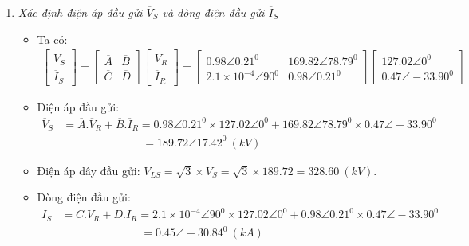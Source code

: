 \documentclass[12pt,a4paper]{article}
\newcommand{\unitp}[1]{~\left({#1}\right)}
\begin{document}
\begin{enumerate}[ \it a. ]
		\item \emph{Xác định điện áp đầu gửi $\overline{V}_S$ và dòng điện đầu gửi $\overline{I}_S$}
			\begin{itemize}
				\item Ta có:
					\begin{align*}
						\left[{\begin{array}{c}
							\overline{V}_S\\
							\overline{I}_S
						\end{array}}\right]
						=
						\left[{\begin{array}{cc}
							\overline{A} & \overline{B}\\
							\overline{C} & \overline{D}
						\end{array}}\right]
						\left[{\begin{array}{c}
							\overline{V}_R\\
							\overline{I}_R
						\end{array}}\right]
						=
						\left[{\begin{array}{cc}
							0.98 \angle 0.21^0 & 169.82 \angle 78.79^0\\
							2.1 \times 10^{-4} \angle 90^0 & 0.98 \angle 0.21^0
						\end{array}}\right]
						\left[{\begin{array}{c}
							127.02 \angle 0^0\\
							0.47 \angle -33.90^0
						\end{array}}\right]
					\end{align*}

				\item Điện áp đầu gửi:
					\begin{align*}
						\overline{V}_S & = \overline{A}. \overline{V}_R + \overline{B}.\overline{I}_R = 0.98 \angle 0.21^0 \times 127.02 \angle 0^0+ 169.82 \angle 78.79^0 \times 0.47 \angle -33.90^0\\
						& \hspace{3cm} = 189.72 \angle 17.42^0 \unitp{kV}
					\end{align*}

				\item Điện áp dây đầu gửi: $V_{LS} = \sqrt{3} \times V_S = \sqrt{3} \times 189.72 = 328.60 \unitp{kV}$.

				\item Dòng điện đầu gửi:
					\begin{align*}
						\overline{I}_S & = \overline{C}. \overline{V}_R + \overline{D}.\overline{I}_R = 2.1 \times 10^{-4} \angle 90^0 \times 127.02 \angle 0^0 + 0.98 \angle 0.21^0 \times 0.47 \angle -33.90^0 \\
						& \hspace{3cm}= 0.45 \angle -30.84^0 \unitp{kA}
					\end{align*}
			\end{itemize}


\end{enumerate}
\end{document}

